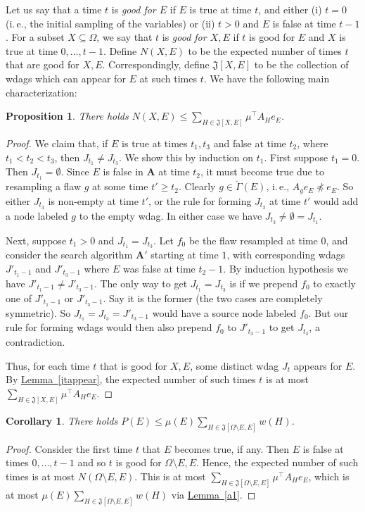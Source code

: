 \documentclass[11pt]{article}
\newcommand{\expref}[2]{\texorpdfstring{\hyperref[#2]{#1~\ref{#2}}}{#1~\ref{#2}}}
\newtheorem{corollary}[theorem]{Corollary}
\newtheorem{proposition}[theorem]{Proposition}
\newcommand{\ie}{i.\,e.}
\begin{document}
Let us say that a time $t$ is \emph{good for $E$} if $E$ is true at time $t$, and either (i) $t = 0$ (\ie, the initial sampling of the variables) or (ii) $t > 0$ and $E$ is false at time $t-1$.   For a subset $X \subseteq \Omega$, we say that $t$ is \emph{good for $X,E$} if $t$ is good for $E$ and $X$ is true at time $0, \dots, t-1$.  Define $N(X,E)$ to be the expected number of times $t$ that are good for $X,E$. Correspondingly, define $\mathfrak J[X,E]$ to be the collection of wdags which can appear for $E$ at such times $t$. We have the following main characterization:
\begin{proposition}
\label{N-prop}
There holds $N(X, E) \leq \sum_{H \in \mathfrak J[X,E]} \mu^{\top} A_H e_E$.
\end{proposition}
\begin{proof}
We claim that, if $E$ is true at times $t_1, t_3$ and false at time $t_2$, where $t_1 < t_2 < t_3$, then $J_{t_1} \neq J_{t_3}$.  We show this by induction on $t_1$. First suppose $t_1 = 0$.  Then $J_{t_1} = \emptyset$.  Since $E$ is false in $\mathbf A$ at time $t_2$, it must become true due to resampling a flaw $g$ at some time $t' \geq t_2 $. Clearly $g \in \check \Gamma(E)$, \ie, $A_g e_E \not \preceq e_E$. So either $J_{t_3}$ is non-empty at time $t'$, or the rule for forming $J_{t_3 }$ at time $t'$ would add a node labeled $g$ to the empty wdag. In either case we have $J_{t_3} \neq \emptyset = J_{t_1}$.

Next, suppose $t_1 > 0$ and $J_{t_1} = J_{t_3}$. Let $f_0$ be the flaw resampled at time $0$, and consider the search algorithm $\mathbf A'$ starting at time $1$, with corresponding wdags $J'_{t_1-1}$ and $J'_{t_3-1}$ where $E$ was false at time $t_2-1$. By induction hypothesis we have $J'_{t_1 - 1} \neq J'_{t_3 - 1}$. The only way to get $J_{t_1} = J_{t_3}$ is if we prepend $f_0$ to exactly one of $J'_{t_1-1}$ or $J'_{t_3-1}$. Say it is the former (the two cases are completely symmetric). So $J_{t_1} = J_{t_3} = J'_{t_3-1}$ would have a source node labeled $f_0$. But our rule for forming wdags would then also prepend $f_0$ to $J'_{t_3-1}$ to get $J_{t_3}$, a contradiction. 

Thus, for each time $t$ that is good for $X,E$, some distinct wdag $J_t$ appears for $E$. By \expref{Lemma}{jtappear}, the expected number of such times $t$ is at most $ \sum_{H \in \mathfrak J[X,E]}   \mu^{\top} A_H e_E$.
\end{proof}

\begin{corollary}
\label{distthm1d}
There holds $P(E) \leq \mu(E) \sum_{H \in \mathfrak J[ \Omega \setminus E, E]} w(H)$.
\end{corollary}
\begin{proof}
Consider the first time $t$ that $E$ becomes true, if any.  Then $E$ is false at times $0, \dots, t-1$ and so $t$ is good for $\Omega \setminus E, E$. Hence, the expected number of such times is at most $N(\Omega \setminus E, E)$. This is at most $\sum_{H \in \mathfrak J[ \Omega \setminus E, E]} \mu^{\top} A_H e_E$, which is at most $\mu(E) \sum_{H \in \mathfrak J[ \Omega \setminus E, E]} w(H)$ via \expref{Lemma}{a1}.
\end{proof}
\end{document}
